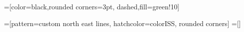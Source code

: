 =[color=black,rounded corners=3pt,
  dashed,fill=green!10]

=[pattern=custom north east lines, hatchcolor=colorISS, rounded corners]
=[]

\newcommand{\setBox}[2]{
    \draw[#1] ($(#2)  + (-1.2,-0.4)$) rectangle ++(2.4,0.8);
}
\newcommand{\bigSetBox}[2]{
    \draw[#1] ($(#2)  + (-1.3,-0.5)$) rectangle ++(2.6,1.0);
}

\newcommand{\extractedBoxText}{{\protect\tikz \protect\draw[extractStyle] (0,0) rectangle ++(0.35,0.35);}}

\newcommand{\coveredBox}[1]{
  \setBox{coveredStyle}{#1}
}
\newcommand{\issuedBox}[1]{
  \setBox{issuedStyle}{#1}
}
\newcommand{\issuedCoveredBox}[1]{
  \bigSetBox{coveredStyle}{#1}
  \issuedBox{#1}
}


\newcommand{\ese}[3]{e^{#1}_{#2#3}}
\newcommand{\mese}[3]{\ese{#1}{#2}{#3}\colon}

\newcommand{\thrdstep}[1]{\xrightarrow{#1}}
\newcommand{\esaddpo}[1]{\xhookrightarrow[\lPO]{#1}}
\newcommand{\esaddjf}[1]{\xhookrightarrow[\lJF]{#1}}
\newcommand{\esaddew}[1]{\xhookrightarrow[\lEW]{#1}}
\newcommand{\esaddco}[1]{\xhookrightarrow[\lCO]{#1}}
\newcommand{\esaddrmw}[1]{\xhookrightarrow[\lRMW]{#1}}
\newcommand{\esstep}[1]{\xhookrightarrow[\mathtt{pre}]{#1}}
\newcommand{\esstepcons}[1]{\xhookrightarrow{#1}}
\newcommand{\travstep}[1]{\xrightarrow{#1}}

\newcommand{\TC}{TC}
\newcommand{\TCinit}[1]{\TC_{\mathrm{init}}({#1})}
\newcommand{\TCfinal}[1]{\TC_{\mathrm{final}}({#1})}

\newcommand{\simrel}{\mathcal{I}}

\newcommand{\ea}{f}
\newcommand{\gs}[1]{\underline{#1}}

\newcommand{\Br}{Br}


\newcommand{\tlab}{\lab^{\lTID}}
\newcommand{\dlab}{\lab^{\lLAB}}
\newcommand{\stlab}{\lab^{\lSTEP}}

\newcommand{\el}{\widehat{l}}


